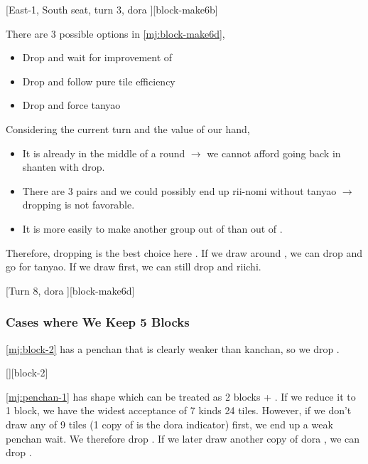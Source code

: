 \documentclass[12pt]{article}
\begin{document}
[East-1, South seat, turn 3, dora ][block-make6b]

There are 3 possible options in \ref{mj:block-make6d},

\begin{itemize}
\item Drop  and wait for improvement of 
\item Drop  and follow pure tile efficiency
\item Drop  and force tanyao
\end{itemize}

Considering the current turn and the value of our hand,

\begin{itemize}
\item It is already in the middle of a round $\to$ we cannot afford going back in shanten with  drop.
\item There are 3 pairs and we could possibly end up rii-nomi without tanyao $\to$ dropping  is not favorable.
\item It is more easily to make another group out of  than out of .
\end{itemize}

Therefore, dropping  is the best choice here \citep[][pp.~57--58]{fkt}. If we draw around , we can drop  and go for tanyao. If we draw  first, we can still drop  and riichi.

[Turn 8, dora ][block-make6d]


\subsubsection*{Cases where We Keep 5 Blocks}

\ref{mj:block-2} has a penchan that is clearly weaker than kanchan, so we drop  \citep[][p. 21]{ishibashi-black}.

[][block-2]

\ref{mj:penchan-1} has  shape which can be treated as 2 blocks  + . If we reduce it to  1 block, we have the widest acceptance of 7 kinds 24 tiles. However, if we don't draw any of  9 tiles (1 copy of  is the dora indicator) first, we end up a weak penchan wait. We therefore drop . If we later draw another copy of dora , we can drop  \citep[][p.~16]{uzaku-nankiru}.
\end{document}
